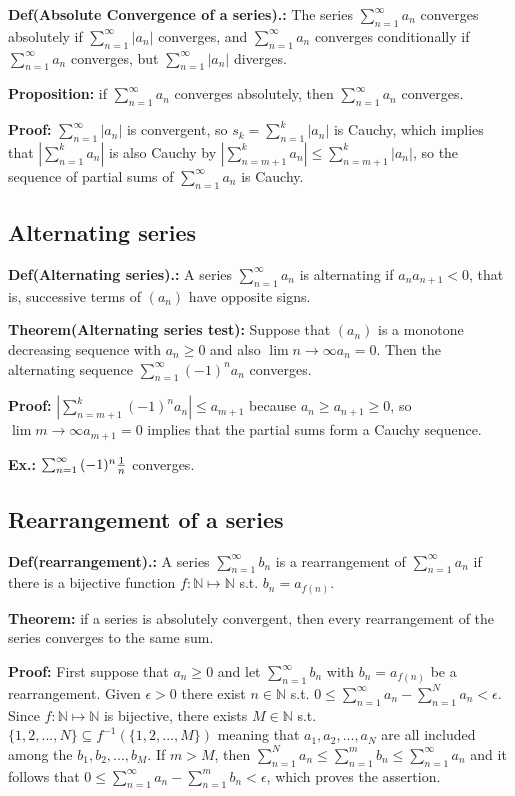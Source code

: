 \documentclass{article}
\begin{document}
\textbf{Def(Absolute Convergence of a series).:} The series $\sum_{n=1}^{\infty}{a_n}$  converges absolutely if $\sum_{n=1}^{\infty}{|a_n|}$ converges, and $\sum_{n=1}^{\infty}{a_n}$ converges conditionally if $\sum_{n=1}^{\infty}{a_n}$ converges, but $\sum_{n=1}^{\infty}{|a_n|}$ diverges.

\textbf{Proposition:} if $\sum_{n=1}^{\infty}{a_n}$ converges absolutely, then $\sum_{n=1}^{\infty}{a_n}$ converges.

\textbf{Proof:} $\sum_{n=1}^{\infty}{|a_n|}$ is convergent, so $s_k=\sum_{n=1}^{k}{|a_n|}$ is Cauchy, which implies that $|\sum_{n=1}^{k}{a_n}|$ is also Cauchy by $|\sum_{n=m+1}^{k}{a_n}| \leq \sum_{n=m+1}^{k}{|a_n|}$, so the sequence of partial sums of $\sum_{n=1}^{\infty}{a_n}$ is Cauchy.

\subsection{Alternating series}

\textbf{Def(Alternating series).:} A series $\sum_{n=1}^{\infty}{a_n}$  is alternating if $a_na_{n+1} < 0$, that is, successive terms of $(a_n)$ have opposite signs.

\textbf{Theorem(Alternating series test):} Suppose that $(a_n)$ is a monotone decreasing sequence with $a_n\geq 0$ and also $\lim{n\to \infty}a_n=0$. Then the alternating sequence $\sum_{n=1}^{\infty}{(-1)^{n}a_n}$ converges.

\textbf{Proof:} $|\sum_{n=m+1}^{k}{(-1)^{n}a_n}|\leq a_{m+1}$ because $a_n\geq a_{n+1}\geq 0$, so $\lim{m\to \infty}a_{m+1}=0$ implies that the partial sums form a Cauchy sequence.

\textbf{Ex.:} $\sum_{n=1}^{\infty}{(-1)^{n}{1\over n}}$ converges.

\subsection{Rearrangement of a series}

\textbf{Def(rearrangement).:} A series $\sum_{n=1}^{\infty}{b_n}$ is a rearrangement of $\sum_{n=1}^{\infty}{a_n}$ if there is a bijective function $f:\mathbb{N}\mapsto \mathbb{N}$ s.t. $b_n=a_{f(n)}$.

\textbf{Theorem:} if a series is absolutely convergent, then every rearrangement of the series converges to the same sum.

\textbf{Proof:} First suppose that $a_n\geq 0$ and let $\sum_{n=1}^{\infty}{b_n}$  with $b_n=a_{f(n)}$ be a rearrangement. Given $\epsilon > 0$ there exist $n\in \mathbb{N}$ s.t. $0\leq \sum_{n=1}^{\infty}{a_n} - \sum_{n=1}^{N}{a_n}<\epsilon$. Since $f:\mathbb{N} \mapsto \mathbb{N}$ is bijective, there exists $M\in \mathbb{N}$ s.t. $\{1,2,...,N\}\subseteq f^{-1}(\{1,2,...,M\})$ meaning that $a_1, a_2, ..., a_N$ are all included among the $b_1, b_2, ..., b_M$. If $m>M$, then $\sum_{n=1}^{N}{a_n}\leq \sum_{n=1}^{m}{b_n}\leq \sum_{n=1}^{\infty}{a_n}$ and it follows that $0\leq \sum_{n=1}^{\infty}{a_n}-\sum_{n=1}^{m}{b_n}<\epsilon $, which proves the assertion.
\end{document}
